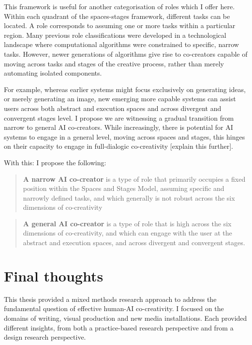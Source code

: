 This framework is useful for another categorisation of roles which I offer here. Within each quadrant of the spaces-stages framework, different tasks can be located. A role corresponds to assuming one or more tasks within a particular region. Many previous role classifications were developed in a technological landscape where computational algorithms were constrained to specific, narrow tasks. However, newer generations of algorithms give rise to co-creators capable of moving across tasks and stages of the creative process, rather than merely automating isolated components.

For example, whereas earlier systems might focus exclusively on generating ideas, or merely generating an image, new emerging more capable systems can assist users across both abstract and execution spaces and across divergent and convergent stages level. I propose we are witnessing a gradual transition from narrow to general AI co-creators.
While increasingly, there is potential for AI systems to engage in a general level, moving across spaces and stages, this hinges on their capacity to engage in full-dialogic co-creativity [explain this further].

With this: I propose the following: 

\begin{quote}
    \textbf{A narrow AI co-creator} is a type of role that primarily occupies a fixed position within the Spaces and Stages Model, assuming specific and narrowly defined tasks, and which generally is not robust across the six dimensions of co-creativity
\end{quote}

\begin{quote}
    \textbf{A general AI co-creator} is a type of role that is high across the six dimensions of co-creativity, and which can engage with the user at the abstract and execution spaces, and across divergent and convergent stages. 
\end{quote}


\section{Final thoughts}

This thesis provided a mixed methods research approach to address the fundamental question of effective human-AI co-creativity. I focused on the domains of writing, visual production and new media installations. Each provided different insights, from both a practice-based research perspective and from a design research perspective. 

